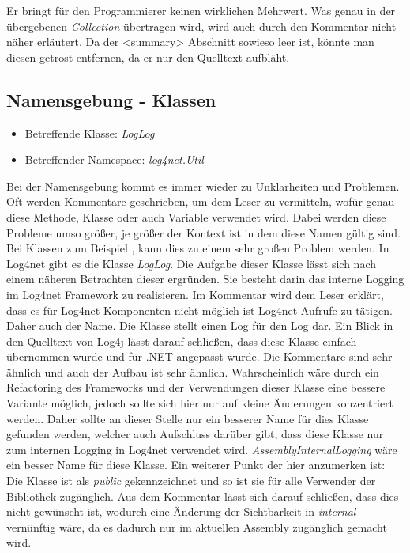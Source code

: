 Er bringt für den Programmierer keinen wirklichen Mehrwert. Was genau in der übergebenen \textit{Collection} übertragen wird, wird auch durch den Kommentar nicht näher erläutert. Da der <summary> Abschnitt sowieso leer ist, könnte man diesen getrost entfernen, da er nur den Quelltext aufbläht. 

\subsection{Namensgebung - Klassen}
\begin{itemize}
	\item Betreffende Klasse: \textit{LogLog}
	\item Betreffender Namespace: \textit{log4net.Util}
\end{itemize}

Bei der Namensgebung kommt es immer wieder zu Unklarheiten und Problemen. Oft werden Kommentare geschrieben, um dem Leser zu vermitteln, wofür genau diese Methode, Klasse oder auch Variable verwendet wird. Dabei werden diese Probleme umso größer, je größer der Kontext ist in dem diese Namen gültig sind. Bei Klassen zum Beispiel , kann dies zu einem sehr großen Problem werden. In Log4net gibt es die Klasse \textit{LogLog}. Die Aufgabe dieser Klasse lässt sich nach einem näheren Betrachten dieser ergründen. Sie besteht darin das interne Logging im Log4net Framework zu realisieren. Im Kommentar wird dem Leser erklärt, dass es für Log4net Komponenten nicht möglich ist Log4net Aufrufe zu tätigen. Daher auch der Name. Die Klasse stellt einen Log für den Log dar. Ein Blick in den Quelltext von Log4j lässt darauf schließen, dass diese Klasse einfach übernommen wurde und für .NET angepasst wurde. Die Kommentare sind sehr ähnlich und auch der Aufbau ist sehr ähnlich. Wahrscheinlich wäre durch ein Refactoring des Frameworks und der Verwendungen dieser Klasse eine bessere Variante möglich, jedoch sollte sich hier nur auf kleine Änderungen konzentriert werden. Daher sollte an dieser Stelle nur ein besserer Name für dies Klasse gefunden werden, welcher auch Aufschluss darüber gibt, dass diese Klasse nur zum internen Logging in Log4net verwendet wird. \textit{AssemblyInternalLogging} wäre ein besser Name für diese Klasse. Ein weiterer Punkt der hier anzumerken ist: Die Klasse ist als \textit{public} gekennzeichnet und so ist sie für alle Verwender der Bibliothek zugänglich. Aus dem Kommentar lässt sich darauf schließen, dass dies nicht gewünscht ist, wodurch eine Änderung der Sichtbarkeit in \textit{internal} vernünftig wäre, da es dadurch nur im aktuellen Assembly zugänglich gemacht wird.

